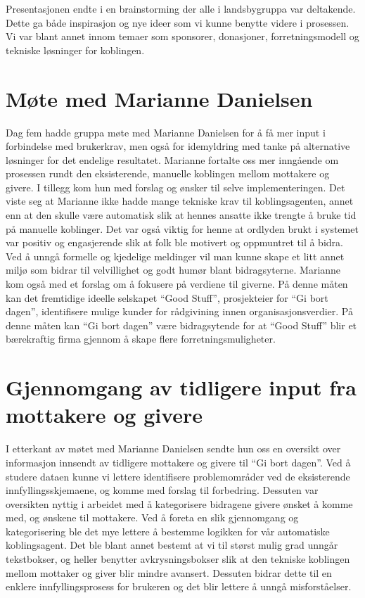 Presentasjonen endte i en brainstorming der alle i landsbygruppa var deltakende. Dette ga både inspirasjon og nye ideer som vi kunne benytte videre i prosessen. Vi var blant annet innom temaer som sponsorer, donasjoner, forretningsmodell og tekniske løsninger for koblingen.

\section{Møte med Marianne Danielsen}
Dag fem hadde gruppa møte med Marianne Danielsen for å få mer input i forbindelse med brukerkrav, men også for idemyldring med tanke på alternative løsninger for det endelige resultatet. Marianne fortalte oss mer inngående om prosessen rundt den eksisterende, manuelle koblingen mellom mottakere og givere. I tillegg kom hun med forslag og ønsker til selve implementeringen. Det viste seg at Marianne ikke hadde mange tekniske krav til koblingsagenten, annet enn at den skulle være automatisk slik at hennes ansatte ikke trengte å bruke tid på manuelle koblinger. Det var også viktig for henne at ordlyden brukt i systemet var positiv og engasjerende slik at folk ble motivert og oppmuntret til å bidra. Ved å unngå formelle og kjedelige meldinger vil man kunne skape et litt annet miljø som bidrar til velvillighet og godt humør blant bidragsyterne. Marianne kom også med et forslag om å fokusere på verdiene til giverne. På denne måten kan det fremtidige ideelle selskapet “Good Stuff”, prosjekteier for ``Gi bort dagen'', identifisere mulige kunder for rådgivining innen organisasjonsverdier. På denne måten kan ``Gi bort dagen'' være bidragsytende for at ``Good Stuff'' blir et bærekraftig firma gjennom å skape flere forretningsmuligheter.

\section{Gjennomgang av tidligere input fra mottakere og givere}
I etterkant av møtet med Marianne Danielsen sendte hun oss en oversikt over informasjon innsendt av tidligere mottakere og givere til ``Gi bort dagen''. Ved å studere dataen kunne vi lettere identifisere problemområder ved de eksisterende innfyllingsskjemaene, og komme med forslag til forbedring. Dessuten var oversikten nyttig i arbeidet med å kategorisere bidragene givere ønsket å komme med, og ønskene til mottakere. Ved å foreta en slik gjennomgang og kategorisering ble det mye lettere å bestemme logikken for vår automatiske koblingsagent. Det ble blant annet bestemt at vi til størst mulig grad unngår tekstbokser, og heller benytter avkrysningsbokser slik at den tekniske koblingen mellom mottaker og giver blir mindre avansert. Dessuten bidrar dette til en enklere innfyllingsprosess for brukeren og det blir lettere å unngå misforståelser.

